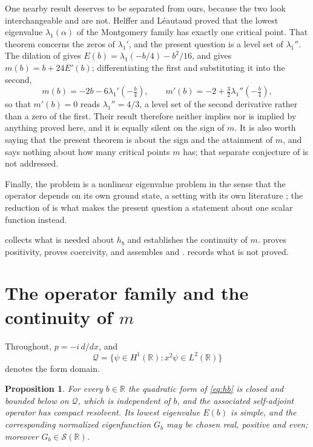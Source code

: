 \documentclass[11pt,reqno]{amsart}
\theoremstyle{plain}
\newtheorem{proposition}[theorem]{Proposition}
\theoremstyle{definition}
\theoremstyle{remark}
\numberwithin{equation}{section}
\begin{document}
One nearby result deserves to be separated from ours, because the two look
interchangeable and are not. Helffer and L\'eautaud \cite{helffer2024critical}
proved that the lowest eigenvalue $\lambda_1(\alpha)$ of the Montgomery family
has exactly one critical point. That theorem concerns the zeros of
$\lambda_1'$, and the present question is a level set of $\lambda_1''$. The
dilation of  gives $E(b)=\lambda_1(-b/4)-b^2/16$, and
 gives $m(b)=b+24E'(b)$; differentiating the first and
substituting it into the second,
\begin{equation}
  \label{eq:montgomery-derivatives}
  m(b)=-2b-6\lambda_1'\!\left(-\tfrac b4\right),
  \qquad
  m'(b)=-2+\tfrac32\lambda_1''\!\left(-\tfrac b4\right),
\end{equation}
so that $m'(b)=0$ reads $\lambda_1''=4/3$, a level set of the second
derivative rather than a zero of the first. Their result therefore neither
implies nor is implied by anything proved here, and it is equally silent on
the sign of $m$. It is also worth saying that the
present theorem is about the sign and the attainment of $m$, and says nothing
about how many critical points $m$ has; that separate conjecture of
\cite{baez1992renormalized} is not addressed.

Finally, the problem is a nonlinear eigenvalue problem in the sense that the
operator depends on its own ground state, a setting with its own literature
\cite{Lai_1979su}; the reduction of \cite{baez1992renormalized} is what makes
the present question a statement about one scalar function instead.

 collects what is needed about $h_b$ and establishes the
continuity of $m$.  proves positivity,
 proves coercivity, and  assembles
 and .  records what is not
proved.

\section{The operator family and the continuity of \texorpdfstring{$m$}{m}}
\label{sec:family}

Throughout, $p=-i\,d/dx$, and
\begin{equation*}
  \mathcal Q=\{\psi\in H^1(\mathbb R):x^2\psi\in L^2(\mathbb R)\}
\end{equation*}
denotes the form domain.

\begin{proposition}
  \label{prop:family}
  For every $b\in\mathbb R$ the quadratic form of \eqref{eq:hb} is closed and
  bounded below on $\mathcal Q$, which is independent of $b$, and the
  associated self-adjoint operator has compact resolvent. Its lowest
  eigenvalue $E(b)$ is simple, and the corresponding normalized eigenfunction
  $G_b$ may be chosen real, positive and even; moreover
  $G_b\in\mathcal S(\mathbb R)$.
\end{proposition}
\end{document}
